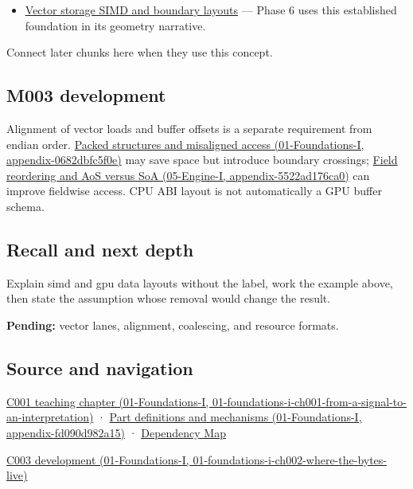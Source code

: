 \begin{itemize}
\tightlist
\item
  \hyperref[appendix-26bf6bf2fb8b]{Vector storage SIMD and boundary layouts} --- Phase 6 uses this established foundation in its geometry narrative.
\end{itemize}

Connect later chunks here when they use this concept.

\subsection{M003 development}\label{appendix-3c7b1a56de01-m003-development}

Alignment of vector loads and buffer offsets is a separate requirement from endian order. \href{../01-Foundations-I/main.pdf\#nameddest=appendix-0682dbfc5f0e}{Packed structures and misaligned access (01-Foundations-I, appendix-0682dbfc5f0e)} may save space but introduce boundary crossings; \href{../05-Engine-I/main.pdf\#nameddest=appendix-5522ad176ca0}{Field reordering and AoS versus SoA (05-Engine-I, appendix-5522ad176ca0)} can improve fieldwise access. CPU ABI layout is not automatically a GPU buffer schema.

\subsection{Recall and next depth}\label{appendix-3c7b1a56de01-recall-and-next-depth}

Explain simd and gpu data layouts without the label, work the example above, then state the assumption whose removal would change the result.

\textbf{Pending:} vector lanes, alignment, coalescing, and resource formats.

\subsection{Source and navigation}\label{appendix-3c7b1a56de01-source-and-navigation}

\href{../01-Foundations-I/main.pdf\#nameddest=01-foundations-i-ch001-from-a-signal-to-an-interpretation}{C001 teaching chapter (01-Foundations-I, 01-foundations-i-ch001-from-a-signal-to-an-interpretation)} · \href{../01-Foundations-I/main.pdf\#nameddest=appendix-fd090d982a15}{Part definitions and mechanisms (01-Foundations-I, appendix-fd090d982a15)} · \hyperref[appendix-4ad47bdd269a]{Dependency Map}

\href{../01-Foundations-I/main.pdf\#nameddest=01-foundations-i-ch002-where-the-bytes-live}{C003 development (01-Foundations-I, 01-foundations-i-ch002-where-the-bytes-live)}

